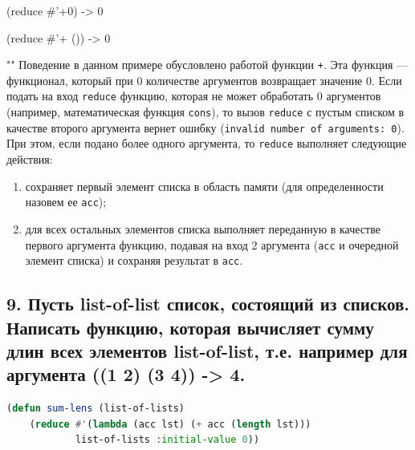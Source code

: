 \documentclass[12pt]{report}
\begin{document}
(reduce \#'+0) -> 0

(reduce \#'+ ()) -> 0

""\newline
Поведение в данном примере обусловлено работой функции \texttt{+}. Эта функция --- функционал, который при 0 количестве аргументов возвращает значение 0. Если подать на вход \texttt{reduce} функцию, которая не может обработать 0 аргументов (например, математическая функция \texttt{cons}), то вызов \texttt{reduce} с пустым списком в качестве второго аргумента вернет ошибку (\texttt{invalid number of arguments: 0}). При этом, если подано более одного аргумента, то \texttt{reduce} выполняет следующие действия:
\begin{enumerate}
	\item сохраняет первый элемент списка в область памяти (для определенности назовем ее \texttt{acc});
	\item для всех остальных элементов списка выполняет переданную в качестве первого аргумента функцию, подавая на вход 2 аргумента (\texttt{acc} и очередной элемент списка) и сохраняя результат в \texttt{acc}.
\end{enumerate}

\subsection*{9. Пусть list-of-list список, состоящий из списков. Написать функцию, которая вычисляет
	сумму длин всех элементов list-of-list, т.е. например для аргумента ((1 2) (3 4)) -> 4.}

\begin{lstlisting}[label=6xd, caption=Решение задания №9, language=lisp]
(defun sum-lens (list-of-lists)
	(reduce #'(lambda (acc lst) (+ acc (length lst)))
			list-of-lists :initial-value 0))

\end{lstlisting}
\end{document}

